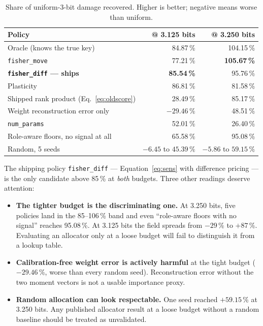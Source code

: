 \documentclass[11pt]{article}
\newcommand{\pct}{\,\%}
\newcommand{\code}[1]{\texttt{#1}}
\begin{document}
\begin{table}[H]
\centering\small
\caption{Share of uniform-3-bit damage recovered. Higher is better; negative means worse than
uniform.}
\begin{tabular}{lrr}
\toprule
Policy & @ 3.125 bits & @ 3.250 bits \\
\midrule
Oracle (knows the true key) & 84.87\pct & 104.15\pct \\
\midrule
\code{fisher\_move} & 77.21\pct & \textbf{105.67\pct} \\
\rowcolor{rowtint}
\textbf{\code{fisher\_diff} --- ships} & \textbf{85.54\pct} & 95.76\pct \\
Plasticity & 86.81\pct & 81.58\pct \\
\midrule
Shipped rank product (Eq.~\ref{eq:oldscore}) & 28.49\pct & 85.17\pct \\
\rowcolor{rowtint}
Weight reconstruction error only & $\mathbf{-29.46\pct}$ & 48.51\pct \\
\code{num\_params} & 52.01\pct & 26.40\pct \\
\midrule
\rowcolor{rowtint}
Role-aware floors, no signal at all & 65.58\pct & 95.08\pct \\
Random, 5 seeds & $-6.45$ to $45.39\pct$ & $-5.86$ to $59.15\pct$ \\
\bottomrule
\end{tabular}
\end{table}

The shipping policy \code{fisher\_diff} --- Equation~\ref{eq:sens} with difference pricing --- is
the only candidate above 85\pct{} at \emph{both} budgets. Three other readings deserve
attention:

\begin{itemize}
\item \textbf{The tighter budget is the discriminating one.} At 3.250 bits, five policies land in
the 85--106\pct{} band and even ``role-aware floors with no signal'' reaches 95.08\pct. At 3.125
bits the field spreads from $-29$\pct{} to $+87$\pct. Evaluating an allocator only at a loose
budget will fail to distinguish it from a lookup table.
\item \textbf{Calibration-free weight error is actively harmful} at the tight budget
($-29.46$\pct, worse than every random seed). Reconstruction error without the two moment vectors
is not a usable importance proxy.
\item \textbf{Random allocation can look respectable.} One seed reached $+59.15$\pct{} at
3.250 bits. Any published allocator result at a loose budget without a random baseline should be
treated as unvalidated.
\end{itemize}
\end{document}
